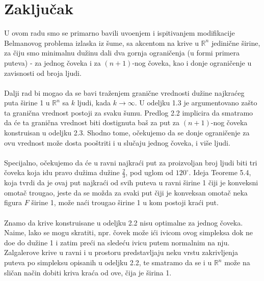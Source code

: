 \documentclass[11pt,letter]{article}
\begin{document}
\section[Zaklju\v cak]{Zaklju\v cak}
\bigskip
U ovom radu smo se primarno bavili uvo\dj enjem i ispitivanjem modifikacije Belmanovog problema izlaska iz \v sume, sa akcentom na krive u $\mathbb{R}^n$ jedini\v cne \v sirine, za \v ciju smo minimalnu du\v zinu dali dva gornja ograni\v cenja (u formi primera puteva) - za jednog \v coveka i za $(n+1)$-nog \v coveka, kao i donje ograni\v cenje u zavisnosti od broja ljudi.
\\
\\
\indent Dalji rad bi mogao da se bavi tra\v zenjem grani\v cne vrednosti du\v zine najkra\' ceg puta \v sirine 1 u $\mathbb{R}^n$ sa $k$ ljudi, kada $k\to \infty$. U odeljku 1.3 je argumentovano za\v sto ta grani\v cna vrednost postoji za svaku \v sumu. Predlog 2.2 implicira da smatramo da \' ce ta grani\v cna vrednost biti dostignuta ba\v s za put za $(n+1)$-nog \v coveka konstruisan u odeljku 2.3. Shodno tome, o\v cekujemo da se donje ograni\v cenje za ovu vrednost mo\v ze dosta poo\v striti i u slu\v caju jednog \v coveka, i vi\v se ljudi.
\\
\\
\indent Specijalno, o\v cekujemo da \' ce u ravni najkra\' ci put za proizvoljan broj ljudi biti tri \v coveka koja idu pravo du\v zima du\v zine $\frac{2}{3}$, pod uglom od $120^\circ$. Ideja Teoreme 5.4, koja tvrdi da je ovaj put najkra\' ci od svih puteva u ravni \v sirine 1 \v ciji je konveksni omota\v c trougao, jeste da se mo\v zda za svaki put \v ciji je konveksan omota\v c neka figura $F$ \v sirine 1, mo\v ze na\' ci trougao \v sirine 1 u kom postoji kra\' ci put.
\\
\\
\indent Znamo da krive konstruisane u odeljku 2.2 nisu optimalne za jednog \v coveka. Naime, lako se mogu skratiti, npr. \v covek mo\v ze i\' ci ivicom ovog simpleksa dok ne do\dj e do du\v zine 1 i zatim pre\' ci na slede\' cu ivicu putem normalnim na nju. Zalgalerove krive u ravni i u prostoru predstavljaju neku vrstu zakrivljenja puteva po simpleksu opisanih u odeljku 2.2, te smatramo da se i u $\mathbb{R}^n$ mo\v ze na sli\v can na\v cin dobiti kriva kra\' ca od ove, \v cija je \v sirina 1.
\bigskip
\bigskip
\end{document}
